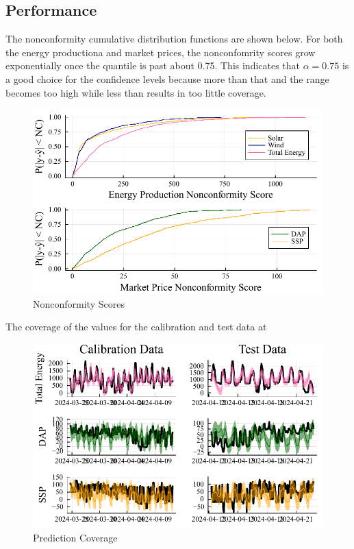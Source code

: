 \documentclass[
  journal,
]{IEEEtran}%
\begin{document}
\subsection{Performance}\label{performance-1}

The nonconformity cumulative distribution functions are shown below. For
both the energy productiona and market prices, the nonconfomrity scores
grow exponentially once the quantile is past about 0.75. This indicates
that \(\alpha=0.75\) is a good choice for the confidence levels because
more than that and the range becomes too high while less than results in
too little coverage.

\begin{figure}

{\centering \includegraphics{EnergyProdConformalLSTM_files/mediabag/EnergyProdConformalLSTM_files/figure-pdf/plot-nonconformity-output-1.pdf}

}

\caption{Nonconformity Scores}

\end{figure}%

The coverage of the values for the calibration and test data at

\begin{figure}

{\centering \includegraphics{EnergyProdConformalLSTM_files/mediabag/EnergyProdConformalLSTM_files/figure-pdf/coverage-output-1.pdf}

}

\caption{Prediction Coverage}

\end{figure}%
\end{document}

